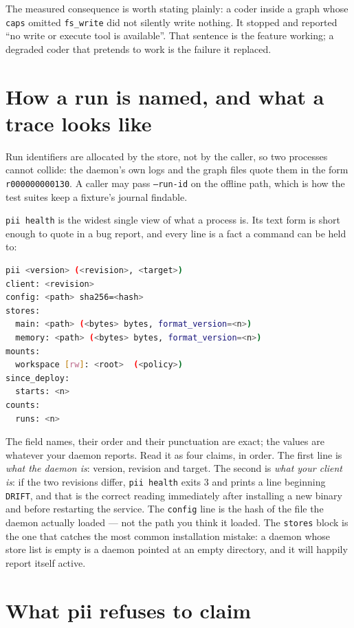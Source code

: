 The measured consequence is worth stating plainly: a coder inside a graph whose
\texttt{caps} omitted \texttt{fs\_write} did not silently write nothing. It stopped and
reported \enquote{no write or execute tool is available}. That sentence is the feature
working; a degraded coder that pretends to work is the failure it replaced.

\section{How a run is named, and what a trace looks like}

Run identifiers are allocated by the store, not by the caller, so two processes cannot
collide: the daemon's own logs and the graph files quote them in the form
\texttt{r000000000130}. A caller may pass \texttt{--run-id} on the offline path, which is
how the test suites keep a fixture's journal findable.

\texttt{pii health} is the widest single view of what a process is. Its text form is
short enough to quote in a bug report, and every line is a fact a command can be held to:

\begin{lstlisting}[language=bash]
pii <version> (<revision>, <target>)
client: <revision>
config: <path> sha256=<hash>
stores:
  main: <path> (<bytes> bytes, format_version=<n>)
  memory: <path> (<bytes> bytes, format_version=<n>)
mounts:
  workspace [rw]: <root>  (<policy>)
since_deploy:
  starts: <n>
counts:
  runs: <n>
\end{lstlisting}

The field names, their order and their punctuation are exact; the values are whatever your
daemon reports. Read it as four claims, in order. The first line is \emph{what the daemon
is}: version, revision and target. The second is \emph{what your client is}: if the two
revisions differ, \texttt{pii health} exits 3 and prints a line beginning \texttt{DRIFT},
and that is the correct reading immediately after installing a new binary and before
restarting the service. The \texttt{config} line is the hash of the file the daemon actually
loaded --- not the path you think it loaded. The \texttt{stores} block is the one that
catches the most common installation mistake: a daemon whose store list is empty is a
daemon pointed at an empty directory, and it will happily report itself active.

\section{What pii refuses to claim}

